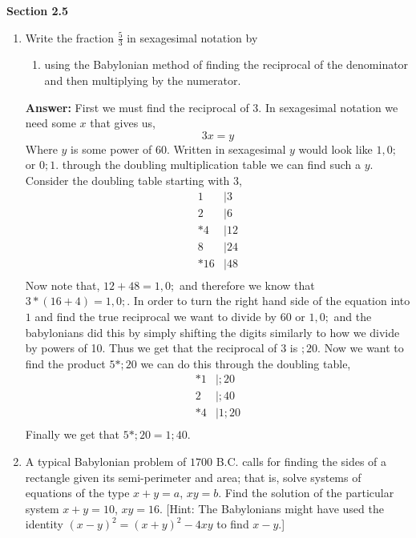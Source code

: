 \documentclass[12pt]{article}
\theoremstyle{homework}
\begin{document}
\textbf{Section 2.5}
\begin{enumerate}
\item Write the fraction $\frac{5}{3}$ in sexagesimal notation by
\begin{enumerate}
\item using the Babylonian method of finding the reciprocal of the denominator and then multiplying by the numerator.\\
\end{enumerate}

\textbf{Answer:} First we must find the reciprocal of 3. In sexagesimal notation we need some $x$ that gives us,
\begin{equation*}
  3x = y
\end{equation*}
Where $y$ is some power of 60. Written in sexagesimal $y$ would look like $1,0;$ or $0;1$. through the doubling multiplication table we can find
such a $y$. Consider the doubling table starting with 3,
\begin{align*}
  1 &| 3\\
  2 &| 6\\
  *4 &| 12\\
  8 &| 24 \\
  *16 &| 48\\
\end{align*} 
Now note that, $12 + 48 = 1,0;$ and therefore we know that $3*(16+4) = 1,0;$. In order to turn the right hand side of the equation into $1$ and find the true reciprocal
we want to divide by $60$ or $1,0;$ and the babylonians did this by simply shifting the digits similarly to how we divide by powers of 10. Thus we get that the reciprocal of 3 is 
$;20$. Now we want to find the product $5 *;20$ we can do this through the doubling table,
\begin{align*}
  *1 &| ;20\\
  2 &| ;40\\
  *4 &| 1;20\\
\end{align*}
Finally we get that $5*;20 = 1;40$.
\vspace{.5in}



\setcounter{enumi}{3}
\item A typical Babylonian problem of $1700$ B.C. calls for finding the sides of a rectangle given its semi-perimeter and area; that is, solve systems of equations of the type $x+y=a$, $xy=b$. Find the solution of the particular system $x+y=10$, $xy=16$. [Hint: The Babylonians might have used the identity $(x-y)^2=(x+y)^2-4xy$ to find $x-y$.]\\


\end{enumerate}
\end{document}
